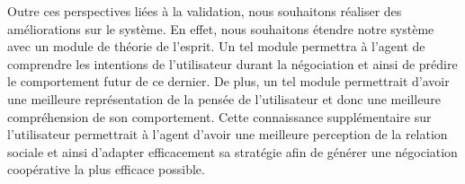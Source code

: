 \documentclass [french]{sig-alternate-05-2015}
\begin{document}
\par Outre ces perspectives liées à la validation, nous souhaitons réaliser des améliorations sur le système. En effet, nous souhaitons étendre notre système avec un module de théorie de l'esprit. Un tel module permettra à l'agent de comprendre les intentions de l'utilisateur durant la négociation et ainsi de prédire le comportement futur de ce dernier. De plus, un tel module permettrait d'avoir une meilleure  représentation de la pensée de l'utilisateur et donc une meilleure compréhension de son comportement. Cette connaissance supplémentaire sur l'utilisateur permettrait à l'agent d'avoir une meilleure perception de la relation sociale et ainsi d'adapter efficacement sa stratégie afin de générer une négociation coopérative la plus efficace possible.
\vskip 5pt


\end{document}
